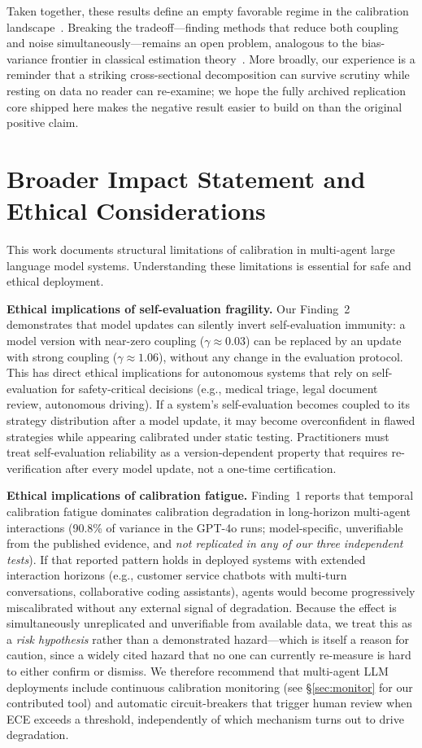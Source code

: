 \documentclass[11pt]{article}
\theoremstyle{definition}
\theoremstyle{remark}
\begin{document}
Taken together, these results define an empty favorable regime in the calibration landscape~\citep{cover2012elements}. Breaking the tradeoff---finding methods that reduce both coupling and noise simultaneously---remains an open problem, analogous to the bias-variance frontier in classical estimation theory~\citep{lehmann1998theory}. More broadly, our experience is a reminder that a striking cross-sectional decomposition can survive scrutiny while resting on data no reader can re-examine; we hope the fully archived replication core shipped here makes the negative result easier to build on than the original positive claim.

\section*{Broader Impact Statement and Ethical Considerations}

This work documents structural limitations of calibration in multi-agent large language model systems. Understanding these limitations is essential for safe and ethical deployment.

\textbf{Ethical implications of self-evaluation fragility.} Our Finding~2 demonstrates that model updates can silently invert self-evaluation immunity: a model version with near-zero coupling ($\gamma \approx 0.03$) can be replaced by an update with strong coupling ($\gamma \approx 1.06$), without any change in the evaluation protocol. This has direct ethical implications for autonomous systems that rely on self-evaluation for safety-critical decisions (e.g., medical triage, legal document review, autonomous driving). If a system's self-evaluation becomes coupled to its strategy distribution after a model update, it may become overconfident in flawed strategies while appearing calibrated under static testing. Practitioners must treat self-evaluation reliability as a version-dependent property that requires re-verification after every model update, not a one-time certification.

\textbf{Ethical implications of calibration fatigue.} Finding~1 reports that temporal calibration fatigue dominates calibration degradation in long-horizon multi-agent interactions (90.8\% of variance in the GPT-4o runs; model-specific, unverifiable from the published evidence, and \emph{not replicated in any of our three independent tests}). If that reported pattern holds in deployed systems with extended interaction horizons (e.g., customer service chatbots with multi-turn conversations, collaborative coding assistants), agents would become progressively miscalibrated without any external signal of degradation. Because the effect is simultaneously unreplicated and unverifiable from available data, we treat this as a \emph{risk hypothesis} rather than a demonstrated hazard---which is itself a reason for caution, since a widely cited hazard that no one can currently re-measure is hard to either confirm or dismiss. We therefore recommend that multi-agent LLM deployments include continuous calibration monitoring (see \S\ref{sec:monitor} for our contributed tool) and automatic circuit-breakers that trigger human review when ECE exceeds a threshold, independently of which mechanism turns out to drive degradation.
\end{document}
